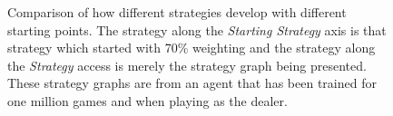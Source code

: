 \begin{figure}
\caption{
	Comparison of how different strategies develop with different
	starting points.
	The strategy along the \textit{Starting Strategy} axis is that strategy
	which started with 70\% weighting
	and the strategy along the \textit{Strategy} access is
	merely the strategy graph being presented.
	These strategy graphs are from an agent that has been trained for one
	million games and when playing as the dealer.
}
\label{fig:findings-expts-sanitycheck-matrix}
\end{figure}
